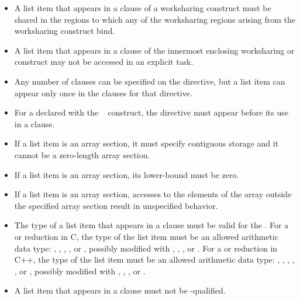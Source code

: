 \begin{itemize}
\item A list item that appears in a  clause of a worksharing construct must be 
shared in the  regions to which any of the worksharing regions arising 
from the worksharing construct bind.

\item A list item that appears in a  clause of the innermost enclosing 
worksharing or  construct may not be accessed in an explicit task.

\item Any number of  clauses can be specified on the directive, but a list item 
can appear only once in the  clauses for that directive.

\item For a  declared with the ~ construct, the 
directive must appear before its use in a  clause.

\item 
If a list item is an array section, it must specify contiguous storage and it cannot be a zero-length array section.

\item If a list item is an array section, its lower-bound must be zero.

\item If a list item is an array section, accesses to the elements of the array outside the specified array section result in unspecified behavior.

\ccppspecificstart
\item The type of a list item that appears in a  clause must be valid for the 
. For a  or  reduction in C, the type of the list item must 
be an allowed arithmetic data type: , , , , or , 
possibly modified with , , , or . For a  or  
reduction in C++, the type of the list item must be an allowed arithmetic data type: 
, , , , , or , possibly modified with , 
, , or .

\item A list item that appears in a  clause must not be -qualified.


\end{itemize}
